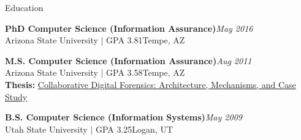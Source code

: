 \documentclass{resume} %
\begin{document}

\begin{rSection}{Education}

\textbf{PhD Computer Science (Information Assurance)}\hfill \emph{May 2016}\\
Arizona State University $\mid$ GPA 3.81\hfill {Tempe, AZ}

\textbf{M.S. Computer Science (Information Assurance)}\hfill \emph{Aug 2011}\\
Arizona State University $\mid$ GPA 3.58\hfill {Tempe, AZ}\\
\textbf{Thesis:} \href{http://repository.asu.edu/attachments/56996/content/Mabey_asu_0010N_10959.pdf}{Collaborative Digital Forensics: Architecture, Mechanisms, and Case Study}

\textbf{B.S. Computer Science (Information Systems)}\hfill \emph{May 2009}\\
Utah State University $\mid$ GPA 3.25\hfill {Logan, UT}


\end{rSection}


\end{document}
